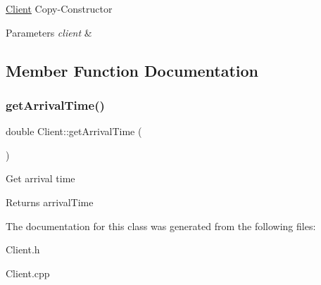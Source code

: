 \hyperlink{classClient}{Client} Copy-\/\+Constructor 
\begin{DoxyParams}{Parameters}
{\em client} & \\
\hline
\end{DoxyParams}


\subsection{Member Function Documentation}
\mbox{\label{classClient_a748d86e8c875f10a5d92c3cf2a12e621}} 
\subsubsection{\texorpdfstring{get\+Arrival\+Time()}{getArrivalTime()}}
{\footnotesize\ttfamily double Client\+::get\+Arrival\+Time (\begin{DoxyParamCaption}{ }\end{DoxyParamCaption})}

Get arrival time \begin{DoxyReturn}{Returns}
arrival\+Time 
\end{DoxyReturn}


The documentation for this class was generated from the following files\+:\begin{DoxyCompactItemize}
\item 
Client.\+h\item 
Client.\+cpp\end{DoxyCompactItemize}
